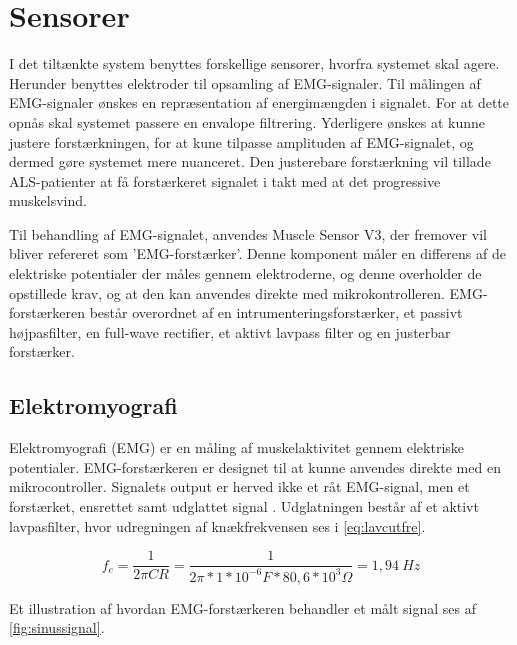 \section{Sensorer} \label{sec:sensorer}
I det tiltænkte system benyttes forskellige sensorer, hvorfra systemet skal agere. Herunder benyttes elektroder til opsamling af EMG-signaler. Til målingen af EMG-signaler ønskes en repræsentation af energimængden i signalet. For at dette opnås skal systemet passere en envalope filtrering. Yderligere ønskes at kunne justere forstærkningen, for at kune tilpasse amplituden af EMG-signalet, og dermed gøre systemet mere nuanceret. Den justerebare forstærkning vil tillade ALS-patienter at få forstærkeret signalet i takt med at det progressive muskelsvind. 

Til behandling af EMG-signalet, anvendes Muscle Sensor V3, der fremover vil bliver refereret som 'EMG-forstærker'. Denne komponent måler en differens af de elektriske potentialer der måles gennem elektroderne, og denne overholder de opstillede krav, og at den kan anvendes direkte med mikrokontrolleren. EMG-forstærkeren består overordnet af en intrumenteringsforstærker, et passivt højpasfilter, en full-wave rectifier, et aktivt lavpass filter og en justerbar forstærker. 

\subsection{Elektromyografi}
Elektromyografi (EMG) er en måling af muskelaktivitet gennem elektriske potentialer. 
EMG-forstærkeren er designet til at kunne anvendes direkte med en mikrocontroller. Signalets output er herved ikke et råt EMG-signal, men et forstærket, ensrettet samt udglattet signal \citep{advancertech2013}. Udglatningen består af et aktivt lavpasfilter, hvor udregningen af knækfrekvensen ses i \autoref{eq:lavcutfre}. 

\begin{equation}\label{eq:lavcutfre}
f_c = \frac{1}{2 \pi C R} = \frac{1}{2 \pi*1*10^{-6}F*80,6*10^3\Omega} = 1,94~Hz
\end{equation}

Et illustration af hvordan EMG-forstærkeren behandler et målt signal ses af \autoref{fig:sinussignal}.

